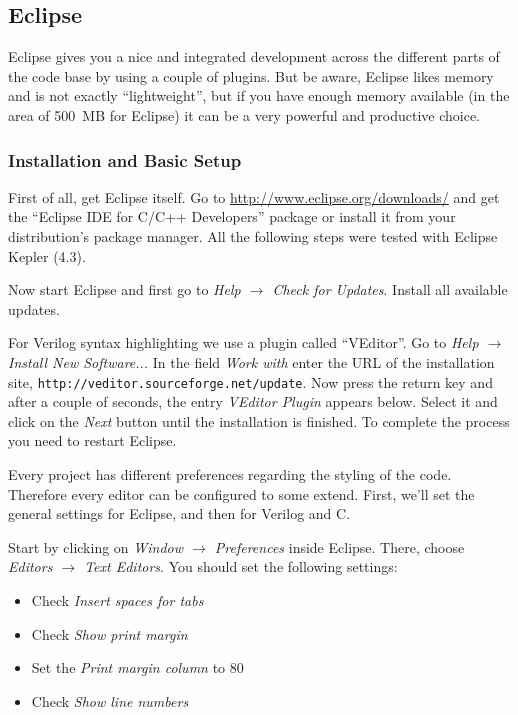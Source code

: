 \subsection{Eclipse}

Eclipse gives you a nice and integrated development across the different parts
of the code base by using a couple of plugins. But be aware, Eclipse likes
memory and is not exactly ``lightweight'', but if you have enough memory
available (in the area of 500~MB for Eclipse) it can be a very powerful and
productive choice.

\subsubsection{Installation and Basic Setup}

First of all, get Eclipse itself. Go to \url{http://www.eclipse.org/downloads/}
and get the ``Eclipse IDE for C/C++ Developers'' package or install it from
your distribution's package manager. All the following steps were tested with
Eclipse Kepler (4.3).

Now start Eclipse and first go to \emph{Help $\rightarrow$ Check for Updates}.
Install all available updates.

For Verilog syntax highlighting we use a plugin called ``VEditor''. Go to
\emph{Help $\rightarrow$ Install New Software...} In the field \emph{Work with}
enter the URL of the installation site,
\verb|http://veditor.sourceforge.net/update|. Now press the return key and after
a couple of seconds, the entry \emph{VEditor Plugin} appears below. Select it
and click on the \emph{Next} button until the installation is finished. To
complete the process you need to restart Eclipse.

Every project has different preferences regarding the styling of the code.
Therefore every editor can be configured to some extend. First, we'll set the
general settings for Eclipse, and then for Verilog and C.

Start by clicking on \emph{Window $\rightarrow$ Preferences} inside Eclipse.
There, choose \emph{Editors $\rightarrow$ Text Editors}. You should set the
following settings:

\begin{itemize}
 \item Check \emph{Insert spaces for tabs}
 \item Check \emph{Show print margin}
 \item Set the \emph{Print margin column} to 80
 \item Check \emph{Show line numbers}
\end{itemize}

